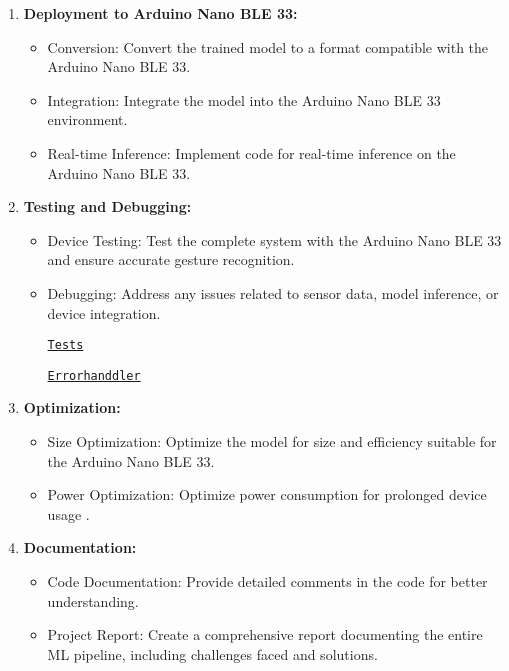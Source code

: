 \begin{enumerate}
\begin{itemize}
	\end{itemize}
	
	\item \textbf{Deployment to Arduino Nano BLE 33:}
	
	\begin{itemize}
		
		\item Conversion: Convert the trained model to a format compatible with the Arduino Nano BLE 33.
		
		\item Integration: Integrate the model into the Arduino Nano BLE 33 environment.
		
		\item Real-time Inference: Implement code for real-time inference on the Arduino Nano BLE 33.
		
	\end{itemize}
	
	\item \textbf{Testing and Debugging:}
	
	\begin{itemize}
		
		\item Device Testing: Test the complete system with the Arduino Nano BLE 33 and ensure accurate gesture recognition.
		
		\item Debugging: Address any issues related to sensor data, model inference, or device integration.
		
		\href{run:../Datatraining}{\texttt{Tests}}
		
		\href{run:../Datatraining}{\texttt{Errorhanddler}}
		
		
	\end{itemize}
	
	\item \textbf{Optimization:}
	
	\begin{itemize}
		
		\item Size Optimization: Optimize the model for size and efficiency suitable for the Arduino Nano BLE 33.
		
		\item Power Optimization: Optimize power consumption for prolonged device usage \cite{Cong:2022}.
		
	\end{itemize}
	
	\item \textbf{Documentation:}
	
	\begin{itemize}
		
		\item Code Documentation: Provide detailed comments in the code for better understanding.
		
		\item Project Report: Create a comprehensive report documenting the entire ML pipeline, including challenges faced and solutions.
		
	\end{itemize}
	
\end{enumerate}

